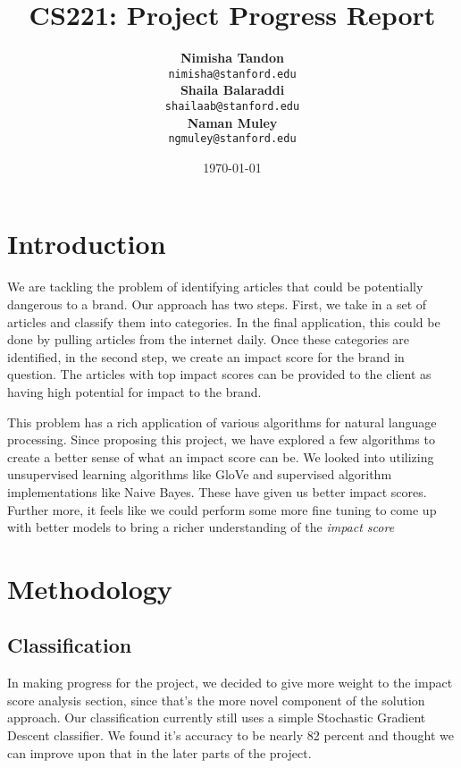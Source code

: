 \documentclass{article}
\title{CS221: Project Progress Report} %
\author{	\textbf{Nimisha Tandon}\\  \texttt{nimisha@stanford.edu} \\
		\textbf{Shaila Balaraddi}\\  \texttt{shailaab@stanford.edu} \\
		\textbf{Naman Muley}\\      \texttt{ngmuley@stanford.edu}}
\date{\today} %
\begin{document}
\maketitle %


\section{Introduction} %

We are tackling the problem of identifying articles that could be potentially dangerous to a brand. Our approach has two steps. First, we take in a set of articles and classify them into categories. In the final application, this could be done by pulling articles from the internet daily. Once these categories are identified, in the second step, we create an impact score for the brand in question. The articles with top impact scores can be provided to the client as having high potential for impact to the brand.

This problem has a rich application of various algorithms for natural language processing. Since proposing this project, we have explored a few algorithms to create a better sense of what an impact score can be. We looked into utilizing unsupervised learning algorithms like GloVe and supervised algorithm implementations like Naive Bayes. These have given us better impact scores. Further more, it feels like we could perform some more fine tuning to come up with better models to bring a richer understanding of the \textit{impact score}

\maketitle %
\section{Methodology} %

\subsection {Classification}
In making progress for the project, we decided to give more weight to the impact score analysis section, since that's the more novel component of the solution approach. Our classification currently still uses a simple Stochastic Gradient Descent classifier. We found it's accuracy to be nearly 82 percent and thought we can improve upon that in the later parts of the project.
\end{document}
